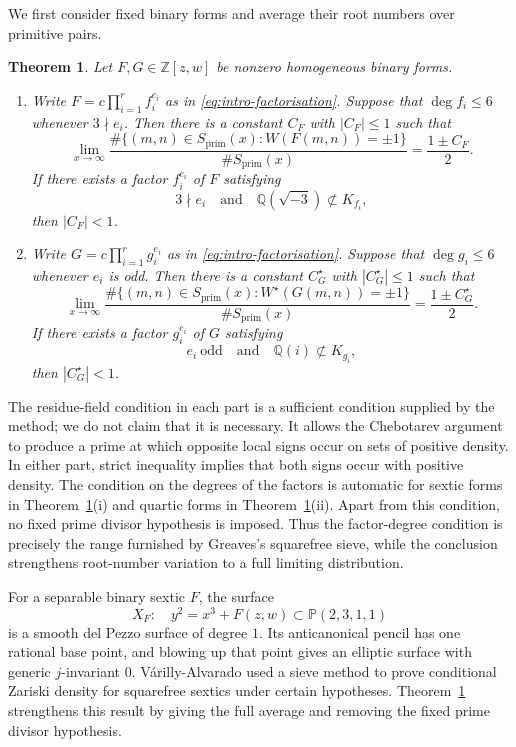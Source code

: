 \documentclass[12pt,reqno]{amsart}
\numberwithin{equation}{section}
\newtheorem{theorem}{Theorem}[section]
\theoremstyle{definition}
\renewcommand{\le}{\leqslant}
\newcommand{\PP}{\mathbb{P}}
\newcommand{\ZZ}{\mathbb{Z}}
\newcommand{\QQ}{\mathbb{Q}}
\newcommand{\rw}{W}
\begin{document}
We first consider fixed binary forms and average their root numbers over primitive pairs.
\begin{theorem}\label{thm:asy}
Let $F,G\in\ZZ[z,w]$ be nonzero homogeneous binary forms.
\begin{enumerate}
\item[(i)] Write $F=c\prod_{i=1}^r f_i^{e_i}$ as in \eqref{eq:intro-factorisation}.
Suppose that $\deg f_i\le6$ whenever $3\nmid e_i$.
Then there is a constant $C_F$ with $|C_F|\le1$ such that
\[
\lim_{x\to\infty}
\frac{\#\{(m,n)\in S_{\mathrm{prim}}(x):\rw(F(m,n))=\pm1\}}
{\#S_{\mathrm{prim}}(x)}
=\frac{1\pm C_F}{2}.
\]
If there exists a factor $f_i^{e_i}$ of $F$ satisfying
\[
3\nmid e_i
\quad\text{and}\quad
\QQ(\sqrt{-3})\not\subset K_{f_i},
\]
then $|C_F|<1$.

\item[(ii)] Write $G=c\prod_{i=1}^r g_i^{e_i}$ as in \eqref{eq:intro-factorisation}.
Suppose that $\deg g_i\le6$ whenever $e_i$ is odd.
Then there is a constant $C_G^\star$ with $|C_G^\star|\le1$ such that
\[
\lim_{x\to\infty}
\frac{\#\{(m,n)\in S_{\mathrm{prim}}(x):\rw^\star(G(m,n))=\pm1\}}
{\#S_{\mathrm{prim}}(x)}
=\frac{1\pm C_G^\star}{2}.
\]
If there exists a factor $g_i^{e_i}$ of $G$ satisfying
\[
e_i\ \text{odd}
\quad\text{and}\quad
\QQ(i)\not\subset K_{g_i},
\]
then $|C_G^\star|<1$.
\end{enumerate}
\end{theorem}

The residue-field condition in each part is a sufficient condition supplied by the method; we do not claim that it is necessary.
It allows the Chebotarev argument to produce a prime at which opposite local signs occur on sets of positive density.
In either part, strict inequality implies that both signs occur with positive density.
The condition on the degrees of the factors is automatic for sextic forms in Theorem~\ref{thm:asy}(i) and quartic forms in Theorem~\ref{thm:asy}(ii).
Apart from this condition, no fixed prime divisor hypothesis is imposed.
Thus the factor-degree condition is precisely the range furnished by Greaves's squarefree sieve, while the conclusion strengthens root-number variation to a full limiting distribution.

For a separable binary sextic $F$, the surface
\begin{equation}\label{eq:DP1-family}
X_F:\quad y^2=x^3+F(z,w)\subset\PP(2,3,1,1)
\end{equation}
is a smooth del Pezzo surface of degree $1$.
Its anticanonical pencil has one rational base point, and blowing up that point gives an elliptic surface with generic $j$-invariant $0$.
V\'arilly-Alvarado \cite[Theorem~2.1]{VA} used a sieve method to prove conditional Zariski density for squarefree sextics under certain hypotheses.
Theorem~\ref{thm:asy} strengthens this result by giving the full average and removing the fixed prime divisor hypothesis.
\end{document}
